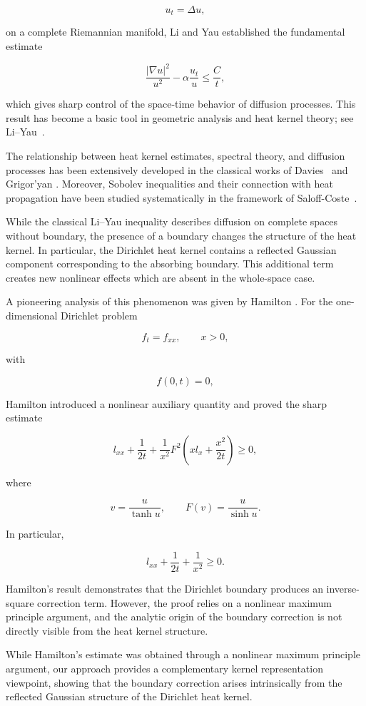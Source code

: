 \documentclass[11pt]{amsart}
\theoremstyle{definition}
\theoremstyle{remark}
\begin{document}
\[
u_t=\Delta u ,
\]

on a complete Riemannian manifold, Li and Yau established the
fundamental estimate

\[
\frac{|\nabla u|^2}{u^2}
-
\alpha\frac{u_t}{u}
\leq
\frac{C}{t},
\]

which gives sharp control of the space-time behavior of diffusion
processes. This result has become a basic tool in geometric analysis
and heat kernel theory; see Li--Yau~\cite{LiYau1986}.


The relationship between heat kernel estimates, spectral theory,
and diffusion processes has been extensively developed in the
classical works of Davies~\cite{Davies1989} and Grigor'yan
\cite{Grigor2009}. Moreover, Sobolev inequalities and their
connection with heat propagation have been studied systematically
in the framework of Saloff-Coste~\cite{SaloffCoste2002}.


While the classical Li--Yau inequality describes diffusion on
complete spaces without boundary, the presence of a boundary changes
the structure of the heat kernel. In particular, the Dirichlet heat
kernel contains a reflected Gaussian component corresponding to the
absorbing boundary. This additional term creates new nonlinear
effects which are absent in the whole-space case.


A pioneering analysis of this phenomenon was given by Hamilton
\cite{Hamilton2011}. For the one-dimensional Dirichlet problem

\[
f_t=f_{xx},
\qquad x>0,
\]

with

\[
f(0,t)=0,
\]

Hamilton introduced a nonlinear auxiliary quantity and proved the
sharp estimate

\[
l_{xx}
+\frac1{2t}
+
\frac1{x^2}
F^2
\left(
xl_x+\frac{x^2}{2t}
\right)
\geq0,
\]

where

\[
v=\frac{u}{\tanh u},
\qquad
F(v)=\frac{u}{\sinh u}.
\]

In particular,

\[
l_{xx}
+\frac1{2t}
+\frac1{x^2}
\geq0 .
\]

Hamilton's result demonstrates that the Dirichlet boundary produces
an inverse-square correction term. However, the proof relies on a
nonlinear maximum principle argument, and the analytic origin of the
boundary correction is not directly visible from the heat kernel
structure.

While Hamilton's estimate was obtained through a nonlinear maximum
principle argument, our approach provides a complementary kernel
representation viewpoint, showing that the boundary correction
arises intrinsically from the reflected Gaussian structure of the
Dirichlet heat kernel.
\end{document}
